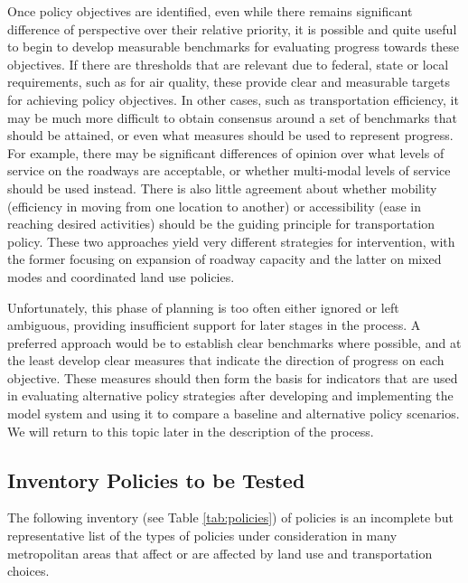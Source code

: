 Once policy objectives are identified, even while there remains significant difference of perspective over their relative priority, it is possible and quite useful to begin to develop measurable benchmarks for evaluating progress towards these objectives.  If there are thresholds that are relevant due to federal, state or local requirements, such as for air quality, these provide clear and measurable targets for achieving policy objectives.  In other cases, such as transportation efficiency, it may be much more difficult to obtain consensus around a set of benchmarks that should be attained, or even what measures should be used to represent progress.  For example, there may be significant differences of opinion over what levels of service on the roadways are acceptable, or whether multi-modal levels of service should be used instead.  There is also little agreement about whether mobility (efficiency in moving from one location to another) or accessibility (ease in reaching desired activities) should be the guiding principle for transportation policy.   These two approaches yield very different strategies for intervention, with the former focusing on expansion of roadway capacity and the latter on mixed modes and coordinated land use policies.

Unfortunately, this phase of planning is too often either ignored or left ambiguous, providing insufficient support for later stages in the process.  A preferred approach would be to establish clear benchmarks where possible, and at the least develop clear measures that indicate the direction of progress on each objective.  These measures should then form the basis for indicators that are used in evaluating alternative policy strategies after developing and implementing the model system and using it to compare a baseline and alternative policy scenarios.  We will return to this topic later in the description of the process.

\subsection{Inventory Policies to be Tested}

The following inventory (see Table \ref{tab:policies}) of policies is an incomplete but representative list of the types of policies under consideration in many metropolitan areas that affect or are affected by land use and transportation choices.

